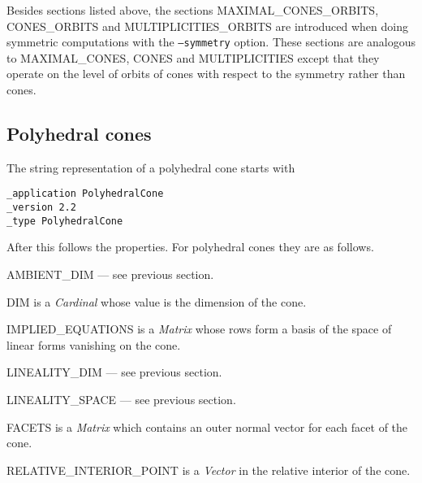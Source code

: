 Besides sections listed above, the sections
MAXIMAL\_CONES\_ORBITS, CONES\_ORBITS and MULTIPLICITIES\_ORBITS
 are introduced when doing symmetric
computations with the \texttt{--symmetry} option. These sections are
analogous to MAXIMAL\_CONES, CONES and MULTIPLICITIES except that they
operate on the level of orbits of cones with respect to the symmetry
rather than cones.



\subsection{Polyhedral cones}
\label{format:cone}
\label{sec:format cone}
The string representation of a polyhedral cone starts with
\begin{verbatim}
_application PolyhedralCone
_version 2.2
_type PolyhedralCone
\end{verbatim}
After this follows the properties. For polyhedral cones they are as follows.

\begin{description}
\item{AMBIENT\_DIM} --- see previous section.
\item{DIM} is a \emph{Cardinal} whose value is the dimension of the cone.
\item{IMPLIED\_EQUATIONS} is a \emph{Matrix} whose rows form a basis of the space of linear forms vanishing on the cone.
\item{LINEALITY\_DIM} --- see previous section.
\item{LINEALITY\_SPACE} --- see previous section.
\item{FACETS} is a \emph{Matrix} which contains an outer normal vector for each facet of the cone.
\item{RELATIVE\_INTERIOR\_POINT} is a \emph{Vector} in the relative interior of the cone.
\end{description}
